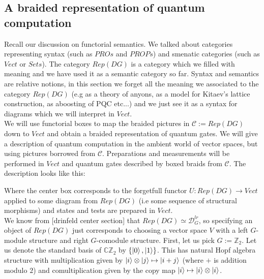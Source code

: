 \documentclass{article}
\newcommand{\cat}{\mathcal{C}}
\begin{document}
\subsection{A braided representation of quantum computation}\label{Abraidedrepresentationofquantumcomputation}
Recall our discussion on functorial semantics. We talked about categories representing syntax (such as $PROs$ and $PROPs$) and smenatic categories (such as $Vect$ or $Sets$). The category $Rep(DG)$ is a category which we filled with meaning and we have used it as a semantic category so far. Syntax and semantics are relative notions, in this section we forget all the meaning we associated to the category $Rep(DG)$ (e.g as a theory of anyons, as a model for Kitaev's lattice construction, as aboosting of PQC etc...) and we just see it as a syntax for diagrams which we will interpret in $Vect$.\\
We will use functorial boxes \cite{Mellies06} to map the braided pictures in $\cat := Rep(DG)$ down to $Vect$ and obtain a braided representation of quantum gates. We will give a description of quantum computation in the ambient world of vector spaces, but using pictures borrowed from $\cat$. Preparations and measurements will be performed in $Vect$ and quantum gates described by boxed braids from $\cat$. The description looks like this:
\begin{center}
\end{center}
Where the center box corresponds to the forgetfull functor $U: Rep(DG) \rightarrow Vect$ applied to some diagram from $Rep(DG)$ (i.e some sequence of structural morphisms) and states and tests are prepared in $Vect$.\\
We know from [drinfeld center section] that $Rep(DG) \simeq \mathcal{D}_G^{lr}$, so specifying an object of $Rep(DG)$ just corresponds to choosing a vector space $V$ with a left $G$-module structure  and right $G$-comodule structure.
First, let us pick $G:= \mathbb{Z}_2$. Let us denote the standard basis of $\mathbb{C}\mathbb{Z}_2$ by $\{ \ket{0}, \ket{1}\}$. This has natural Hopf algebra structure with multiplication given by $\ket{i}\otimes \ket{j} \mapsto \ket{i+j}$ (where $+$ is addition modulo $2$) and comultiplication given by the copy map $\ket{i} \mapsto \ket{i}\otimes \ket{i} $.
\end{document}
